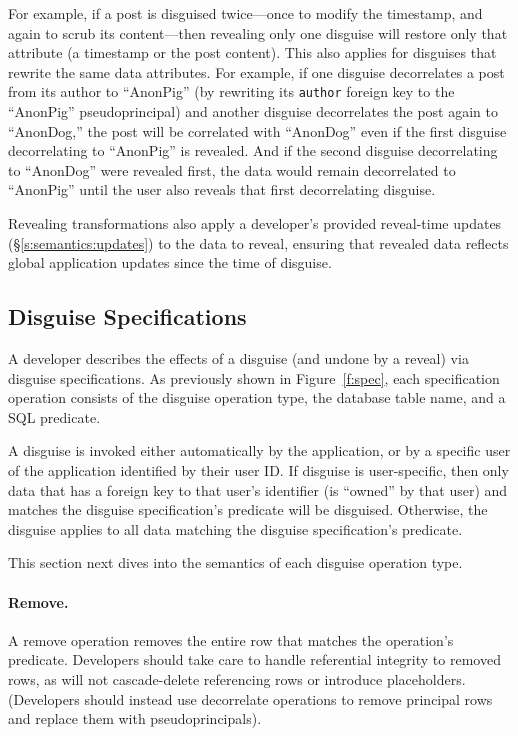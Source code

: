 %
For example, if a post is disguised twice---once to modify the timestamp, and
again to scrub its content---then revealing only one disguise will restore only
that attribute (\eg a timestamp or the post content). 
%
This also applies for disguises that rewrite the same data attributes. For
example, if one disguise decorrelates a post from its author to ``AnonPig''
(\ie by rewriting its \texttt{author} foreign key to the ``AnonPig''
pseudoprincipal) and another disguise decorrelates the post again to
``AnonDog,'' the post will be correlated with ``AnonDog'' even if the
first disguise decorrelating to ``AnonPig'' is revealed.
%
And if the second disguise decorrelating to ``AnonDog'' were revealed
first, the data would remain decorrelated to ``AnonPig'' until the user
also reveals that first decorrelating disguise.
%

%
Revealing transformations also apply a developer's provided reveal-time updates
(\S\ref{s:semantics:updates}) to the data to reveal, ensuring that revealed data
reflects global application updates since the time of disguise.
%

\subsection{Disguise Specifications}
\label{s:spec}

%
A developer describes the effects of a disguise (and undone by a
reveal) via disguise specifications.  As previously shown in
Figure~\ref{f:spec}, each specification operation consists of the disguise
operation type, the database table name, 
and a SQL  predicate.

%
A disguise is invoked either automatically by the application, or by a specific
user of the application identified by their user ID. 
% 
If disguise is user-specific, then only data that has a foreign key to that
user's identifier (is ``owned'' by that user) and matches the disguise
specification's predicate will be disguised.  Otherwise, the disguise applies to
all data matching the disguise specification's predicate.

This section next dives into the semantics of each disguise operation type.
%

\paragraph{Remove.}
A remove operation removes the entire row that matches the operation's
predicate.
%
Developers should take care to handle referential integrity to removed rows, as
\sys will not cascade-delete referencing rows or introduce placeholders.
(Developers should instead use decorrelate operations to remove principal
rows and replace them with pseudoprincipals).
%

